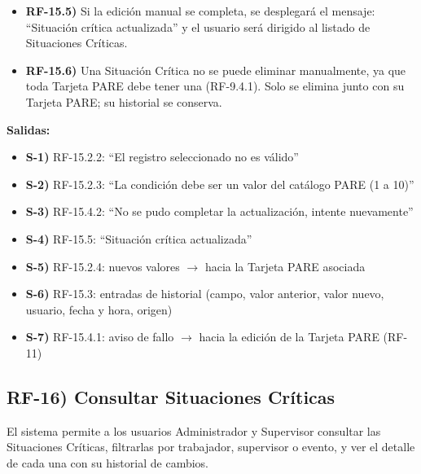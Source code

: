 \begin{itemize}[label={}, leftmargin=1.5em]
\begin{itemize}[label={}, leftmargin=1.5em]
    \item \textbf{RF-15.4.1)} En la sincronizaci\'on, el fallo se notificar\'a a la edici\'on de la Tarjeta PARE (RF-11), que tampoco se guardar\'a.
    \item \textbf{RF-15.4.2)} En la edici\'on manual, se notificar\'a: ``No se pudo completar la actualizaci\'on, intente nuevamente''.
  \end{itemize}
  \item \textbf{RF-15.5)} Si la edici\'on manual se completa, se desplegar\'a el mensaje: ``Situaci\'on cr\'itica actualizada'' y el usuario ser\'a dirigido al listado de Situaciones Cr\'iticas.
  \item \textbf{RF-15.6)} Una Situaci\'on Cr\'itica no se puede eliminar manualmente, ya que toda Tarjeta PARE debe tener una (RF-9.4.1). Solo se elimina junto con su Tarjeta PARE; su historial se conserva.
\end{itemize}

\textbf{Salidas:}
\begin{itemize}[label={}, leftmargin=1.5em]
  \item \textbf{S-1)} RF-15.2.2: ``El registro seleccionado no es v\'alido''
  \item \textbf{S-2)} RF-15.2.3: ``La condici\'on debe ser un valor del cat\'alogo PARE (1 a 10)''
  \item \textbf{S-3)} RF-15.4.2: ``No se pudo completar la actualizaci\'on, intente nuevamente''
  \item \textbf{S-4)} RF-15.5: ``Situaci\'on cr\'itica actualizada''
  \item \textbf{S-5)} RF-15.2.4: nuevos valores $\rightarrow$ hacia la Tarjeta PARE asociada
  \item \textbf{S-6)} RF-15.3: entradas de historial (campo, valor anterior, valor nuevo, usuario, fecha y hora, origen)
  \item \textbf{S-7)} RF-15.4.1: aviso de fallo $\rightarrow$ hacia la edici\'on de la Tarjeta PARE (RF-11)
\end{itemize}

\subsection*{RF-16) Consultar Situaciones Cr\'iticas}
El sistema permite a los usuarios Administrador y Supervisor consultar las Situaciones Cr\'iticas, filtrarlas por trabajador, supervisor o evento, y ver el detalle de cada una con su historial de cambios.

